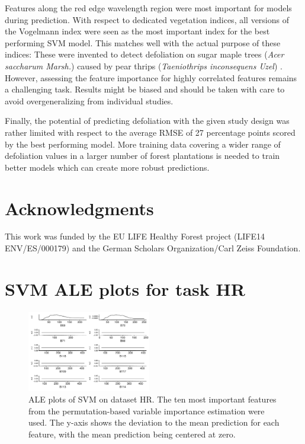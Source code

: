 \documentclass[letterpaper, peerreview, draftcls]{IEEEtran}
\begin{document}
Features along the red edge wavelength region were most important for models during prediction.
With respect to dedicated vegetation indices, all versions of the Vogelmann index were seen as the most important index for the best performing SVM model.
This matches well with the actual purpose of these indices:
These were invented to detect defoliation on sugar maple trees (\textit{Acer saccharum Marsh.}) caused by pear thrips (\textit{Taeniothrips inconsequens Uzel}) \cite{vogelmann1993}.
However, assessing the feature importance for highly correlated features remains a challenging task.
Results might be biased and should be taken with care to avoid overgeneralizing from individual studies.

Finally, the potential of predicting defoliation with the given study design was rather limited with respect to the average RMSE of 27 percentage points scored by the best performing model.
More training data covering a wider range of defoliation values in a larger number of forest plantations is needed to train better models which can create more robust predictions.

\section{Acknowledgments}
This work was funded by the EU LIFE Healthy Forest project (LIFE14 ENV/ES/000179) and the German Scholars Organization/Carl Zeiss Foundation.

\appendices{}

\section{SVM ALE plots for task HR}

\begin{figure} [ht]
	\begin{center}
		\includegraphics[width=0.48\textwidth] {fi-hr-ale-1.pdf}
		\caption{ALE plots of SVM on dataset HR. The ten most important features from the permutation-based variable importance estimation were used. The y-axis shows the deviation to the mean prediction for each feature, with the mean prediction being centered at zero.}\label{fig:fi-hr-ale}
	\end{center}
\end{figure}
\end{document}
